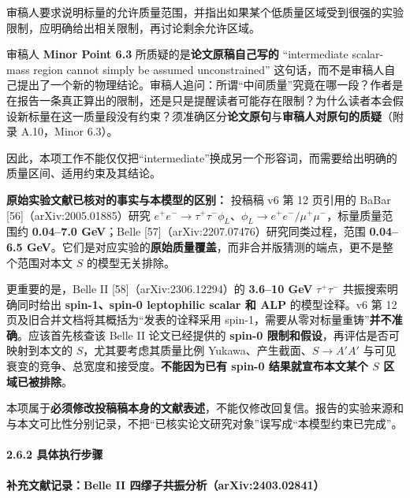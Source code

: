 \documentclass[
]{article}
\begin{document}
审稿人要求说明标量的允许质量范围，并指出如果某个低质量区域受到很强的实验限制，应明确给出相关限制，再讨论剩余允许区域。

审稿人 \textbf{Minor Point 6.3} 所质疑的是\textbf{论文原稿自己写的}
``intermediate scalar-mass region cannot simply be assumed
unconstrained''
这句话，而不是审稿人自己提出了一个新的物理结论。审稿人追问：所谓``中间质量''究竟在哪一段？作者是在报告一条真正算出的限制，还是只是提醒读者可能存在限制？为什么读者本会假设新标量在这一质量段没有约束？须准确区分\textbf{论文原句}与\textbf{审稿人对原句的质疑}（附录
A.10，Minor 6.3）。

因此，本项工作不能仅仅把``intermediate''换成另一个形容词，而需要给出明确的质量区间、适用约束及其结论。

\textbf{原始实验文献已核对的事实与本模型的区别：} 投稿稿 v6 第 12
页引用的 BaBar {[}56{]}（arXiv:2005.01885）研究
\(e^+e^-\to\tau^+\tau^-\phi_L\)、\(\phi_L\to e^+e^-/\mu^+\mu^-\)，标量质量范围约
\textbf{0.04--7.0 GeV}；Belle
{[}57{]}（arXiv:2207.07476）研究同类过程，范围 \textbf{0.04--6.5
GeV}。它们是对应实验的\textbf{原始质量覆盖}，而非合并版猜测的端点，更不是整个范围对本文
\(S\) 的模型无关排除。

更重要的是，Belle II {[}58{]}（arXiv:2306.12294）的 \textbf{3.6--10 GeV}
\(\tau^+\tau^-\) 共振搜索明确同时给出 \textbf{spin-1、spin-0 leptophilic
scalar 和 ALP} 的模型诠释。v6 第 12
页及旧合并文档将其概括为``发表的诠释采用
spin-1，需要从零对标量重铸''\textbf{并不准确}。应该首先核查该 Belle II
论文已经提供的 \textbf{spin-0 限制和假设}，再评估是否可映射到本文的
\(S\)，尤其要考虑其质量比例 Yukawa、产生截面、\(S\to A'A'\)
与可见衰变的竞争、总宽度和接受度。\textbf{不能因为已有 spin-0
结果就宣布本文某个 \(S\) 区域已被排除}。

本项属于\textbf{必须修改投稿稿本身的文献表述}，不能仅修改回复信。报告的实验来源和与本文可比性分别记录，不把``已核实论文研究对象''误写成``本模型约束已完成''。

\paragraph{2.6.2
具体执行步骤}\label{ux5177ux4f53ux6267ux884cux6b65ux9aa4}

\paragraph{补充文献记录：Belle II
四缪子共振分析（arXiv:2403.02841）}\label{ux8865ux5145ux6587ux732eux8bb0ux5f55belle-ii-ux56dbux7f2aux5b50ux5171ux632fux5206ux6790arxiv2403.02841}
\end{document}
